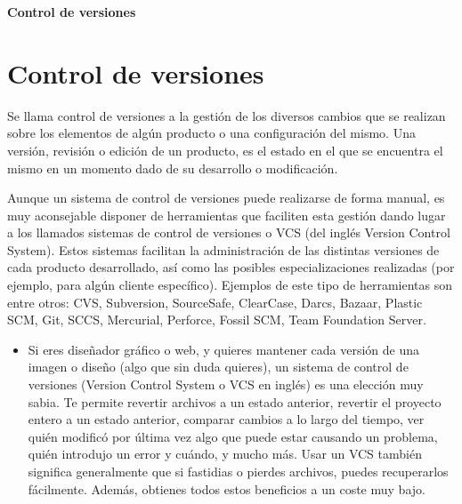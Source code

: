 
\begin{Large}
\begin{center}
\textbf{Control de versiones} \\
\end{center}
\end{Large}

\section{Control de versiones} 
Se llama control de versiones a la gestión de los diversos cambios que se realizan sobre los elementos de algún producto o una configuración del mismo. Una versión, revisión o edición de un producto, es el estado en el que se encuentra el mismo en un momento dado de su desarrollo o modificación.

Aunque un sistema de control de versiones puede realizarse de forma manual, es muy aconsejable disponer de herramientas que faciliten esta gestión dando lugar a los llamados sistemas de control de versiones o VCS (del inglés Version Control System). Estos sistemas facilitan la administración de las distintas versiones de cada producto desarrollado, así como las posibles especializaciones realizadas (por ejemplo, para algún cliente específico). Ejemplos de este tipo de herramientas son entre otros: CVS, Subversion, SourceSafe, ClearCase, Darcs, Bazaar, Plastic SCM, Git, SCCS, Mercurial, Perforce, Fossil SCM, Team Foundation Server.

\begin{itemize}
	\begin{center}
	\texttt{[image: ./Imagenes/imagen2]} 
	\end{center}

	\item Si eres diseñador gráfico o web, y quieres mantener cada versión de una imagen o diseño (algo que sin duda quieres), un sistema de control de versiones (Version Control System o VCS en inglés) es una elección muy sabia. Te permite revertir archivos a un estado anterior, revertir el proyecto entero a un estado anterior, comparar cambios a lo largo del tiempo, ver quién modificó por última vez algo que puede estar causando un problema, quién introdujo un error y cuándo, y mucho más. Usar un VCS también significa generalmente que si fastidias o pierdes archivos, puedes recuperarlos fácilmente. Además, obtienes todos estos beneficios a un coste muy bajo.



\end{itemize} 